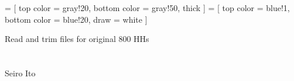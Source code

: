 

\renewcommand\Routcolor{\color{gray30}}
\newtheorem{finding}{Finding}[section]
\makeatletter
\g@addto@macro{\UrlBreaks}{\UrlOrds}
\newcommand\gobblepars{%
    \@ifnextchar\par%
        {\expandafter\gobblepars\@gobble}%
        {}}
\newenvironment{lightgrayleftbar}{%
  \def\FrameCommand{\textcolor{lightgray}{\vrule width 1zw} \hspace{10pt}}%
  \MakeFramed {\advance\hsize-\width \FrameRestore}}%
{\endMakeFramed}
\newenvironment{palepinkleftbar}{%
  \def\FrameCommand{\textcolor{palepink}{\vrule width 1zw} \hspace{10pt}}%
  \MakeFramed {\advance\hsize-\width \FrameRestore}}%
{\endMakeFramed}
\makeatother
\usepackage{caption}
\usepackage{setspace}
\usepackage{framed}
\def\pgfsysdriver{pgfsys-dvipdfm.def}
\usepackage{tikz}
\usetikzlibrary{calc, arrows, decorations, decorations.pathreplacing, backgrounds}
\usepackage{adjustbox}
 =
[
top color = gray!20, bottom color = gray!50, thick
]
 =
[
top color = blue!1, bottom color = blue!20, draw = white
]

\ifdefined\knitrout
\renewenvironment{knitrout}
{\definecolor{warningcolor}{rgb}{0, 1, 0} \definecolor{errorcolor}{rgb}{1, 0, 0}}
{  }
\else
\fi


\setlength{\baselineskip}{12pt}

\hfil Read and trim files for original 800 HHs\\

\hfil\MonthDY\\
\hfil{\footnotesize\currenttime}\\

\hfil Seiro Ito

